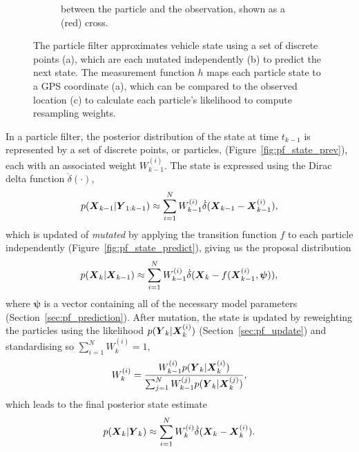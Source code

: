 \documentclass[times, doublespace]{anzsauth}
\begin{document}
\begin{figure}[p]
\begin{subfigure}[t]{0.9\textwidth}
{            between the particle and the observation, shown as a (red) cross.
        }
        \label{fig:pf_state_predict2}
    \end{subfigure}
    \caption{
        The particle filter approximates vehicle state using a set of
        discrete points (a), which are each mutated independently (b)
        to predict the next state.
        The measurement function $h$ maps each particle state
        to a GPS coordinate (a),
        which can be compared to the observed location (c)
        to calculate each particle's likelihood to compute resampling weights.
    }
    \label{fig:pf_state}
\end{figure}

\afterpage{\clearpage}

In a particle filter, the posterior distribution of the state at time $t_{k-1}$
is represented by a set of discrete points, or particles, (Figure~\ref{fig:pf_state_prev}),
each with an associated weight $W_{k-1}^{(i)}$.
The state is expressed using the Dirac delta function $\dot\delta(\cdot)$,
\begin{equation*}
p(\mbox{$\boldsymbol{X}$}_{k-1} | \mbox{$\boldsymbol{Y}$}_{1:k-1}) \approx
    \sum_{i=1}^N W_{k-1}^{(i)} \dot\delta(\mbox{$\boldsymbol{X}$}_{k-1} - \mbox{$\boldsymbol{X}$}_{k-1}^{(i)}),
\end{equation*}
which is updated of \emph{mutated} by applying the transition function $f$
to each particle independently (Figure~\ref{fig:pf_state_predict}),
giving us the proposal distribution
\begin{equation*}
p(\mbox{$\boldsymbol{X}$}_k | \mbox{$\boldsymbol{X}$}_{k-1}) \approx
    \sum_{i=1}^N W_{k-1}^{(i)} \dot\delta(\mbox{$\boldsymbol{X}$}_{k} - f(\mbox{$\boldsymbol{X}$}_{k-1}^{(i)}, \boldsymbol{\psi})),
\end{equation*}
where $\boldsymbol{\psi}$ is a vector containing all of the necessary model parameters
(Section~\ref{sec:pf_prediction}).
After mutation,
the state is updated by reweighting the particles using the likelihood $p(\mbox{$\boldsymbol{Y}$}_k | \mbox{$\boldsymbol{X}$}_k^{(i)})$
(Section~\ref{sec:pf_update}) and standardising so $\sum_{i=1}^N W_k^{(i)} = 1$,
\begin{equation*}
W_k^{(i)} = \frac{W_{k-1}^{(i)} p(\mbox{$\boldsymbol{Y}$}_k | \mbox{$\boldsymbol{X}$}_k^{(i)})}{
    \sum_{j=1}^N W_{k-1}^{(j)} p(\mbox{$\boldsymbol{Y}$}_k | \mbox{$\boldsymbol{X}$}_k^{(j)})
},
\end{equation*}
which leads to the final posterior state estimate
\begin{equation*}
p(\mbox{$\boldsymbol{X}$}_k | \mbox{$\boldsymbol{Y}$}_k) \approx
    \sum_{i=1}^N W_{k}^{(i)} \dot\delta(\mbox{$\boldsymbol{X}$}_{k} - \mbox{$\boldsymbol{X}$}_{k}^{(i)}).
\end{equation*}
\end{document}
